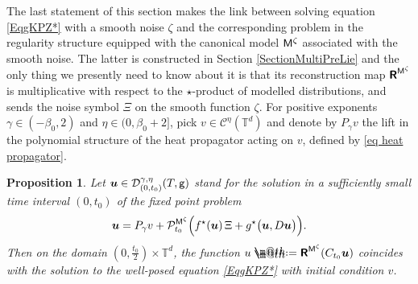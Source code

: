 \documentclass[10pt, reqno]{amsart}
\makeatletter
\numberwithin{subsection}{section}
\numberwithin{subsubsection}{subsection}
\numberwithin{equation}{section} %
\theoremstyle{mystyle}
\newtheorem{prop}[thm]{\hspace{-0.13cm} {Proposition}}%
\theoremstyle{mystyle2}
\theoremstyle{mystyle3}
\newcommand{\bsu}{\boldsymbol{u}}
\newcommand{\bbT}{\mathbb{T}}
\newcommand{\mcC}{\mathcal{C}}
\newcommand{\mcD}{\mathcal{D}}
\newcommand{\mcP}{\mathcal{P}}
\newcommand*{\defeq}{\mathrel{\rlap{%
                     \raisebox{0.3ex}{$\m@th\cdot$}}%
                     \raisebox{-0.3ex}{$\m@th\cdot$}}%
                     =}
\makeatother
\begin{document}
\medskip

The last statement of this section makes the link between solving equation \eqref{EqgKPZ*} with a smooth noise $\zeta$ and the corresponding problem in the regularity structure equipped with the canonical model ${\sf M}^\zeta$ associated with the smooth noise. The latter is constructed in Section \ref{SectionMultiPreLie} and the only thing we presently need to know about it is that its reconstruction map $\textsf{\textbf{R}}^{{\sf M}^\zeta}$ is multiplicative with respect to the $\star$-product of modelled distributions, and sends the noise symbol $\Xi$ on the smooth function $\zeta$. For positive exponents $\gamma\in(-\beta_0,2)$ and $\eta\in(0,\beta_0+2]$, pick $v\in \mcC^\eta(\bbT^d)$ and denote by $P_\gamma v$ the lift in the polynomial structure of the heat propagator acting 
on $v$, defined by \eqref{eq heat propagator}.

\medskip

\begin{prop}   \label{PropRSCharacterizationSmoothPDE}
Let $\bsu\in\mcD_{(0,t_0)}^{\gamma,\eta}(T,\sf g)$ stand for the solution 
in a sufficiently small time interval $(0,t_0)$ of the fixed point problem
\begin{equation}   \label{EqRSgKPZ}
\bsu = P_\gamma v+\mcP_{t_0}^{{\sf M}^\zeta}\Big(f^\star(\bsu)\,\Xi + g^\star\big(\bsu,D\bsu\big)\Big).
\end{equation}
Then on the domain $(0,\frac{t_0}2)\times\bbT^d$, the function $u\defeq \textbf{\textsf{R}}^{{\sf M}^\zeta}(C_{t_0}\bsu)$ coincides with the solution to the well-posed equation \eqref{EqgKPZ*} with initial condition $v$.
\end{prop}

\medskip
\end{document}
